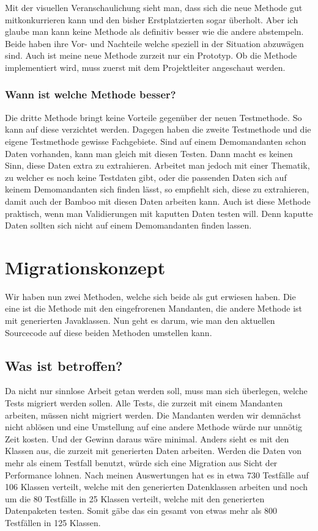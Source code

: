 Mit der visuellen Veranschaulichung sieht man, dass sich die neue Methode gut mitkonkurrieren kann und den bisher Erstplatzierten sogar überholt. Aber ich glaube man kann keine Methode als definitiv besser wie die andere abstempeln. Beide haben ihre Vor- und Nachteile welche speziell in der Situation abzuwägen sind. Auch ist meine neue Methode zurzeit nur ein Prototyp. Ob die Methode implementiert wird, muss zuerst mit dem Projektleiter angeschaut werden.
\subsubsection{Wann ist welche Methode besser?}
Die dritte Methode bringt keine Vorteile gegenüber der neuen Testmethode. So kann auf diese verzichtet werden. Dagegen haben die zweite Testmethode und die eigene Testmethode gewisse Fachgebiete. Sind auf einem Demomandanten schon Daten vorhanden, kann man gleich mit diesen Testen. Dann macht es keinen Sinn, diese Daten extra zu extrahieren. Arbeitet man jedoch mit einer Thematik, zu welcher es noch keine Testdaten gibt, oder die passenden Daten sich auf keinem Demomandanten sich finden lässt, so empfiehlt sich, diese zu extrahieren, damit auch der Bamboo mit diesen Daten arbeiten kann. Auch ist diese Methode praktisch, wenn man Validierungen mit kaputten Daten testen will. Denn kaputte Daten sollten sich nicht auf einem Demomandanten finden lassen.

\section{Migrationskonzept} \label{Migrationskonzept}
Wir haben nun zwei Methoden, welche sich beide als gut erwiesen haben. Die eine ist die Methode mit den eingefrorenen Mandanten, die andere Methode ist mit generierten Javaklassen. Nun geht es darum, wie man den aktuellen Sourcecode auf diese beiden Methoden umstellen kann.
\subsection{Was ist betroffen?}
Da nicht nur sinnlose Arbeit getan werden soll, muss man sich überlegen, welche Tests migriert werden sollen. Alle Tests, die zurzeit mit einem Mandanten arbeiten, müssen nicht migriert werden. Die Mandanten werden wir demnächst nicht ablösen und eine Umstellung auf eine andere Methode würde nur unnötig Zeit kosten. Und der Gewinn daraus wäre minimal. Anders sieht es mit den Klassen aus, die zurzeit mit generierten Daten arbeiten. Werden die Daten von mehr als einem Testfall benutzt, würde sich eine Migration aus Sicht der Performance lohnen. Nach meinen Auswertungen hat es in etwa 730 Testfälle auf 106 Klassen verteilt, welche mit den generierten Datenklassen arbeiten und noch um die 80 Testfälle in 25 Klassen verteilt, welche mit den generierten Datenpaketen testen. Somit gäbe das ein gesamt von etwas mehr als 800 Testfällen in 125 Klassen.
